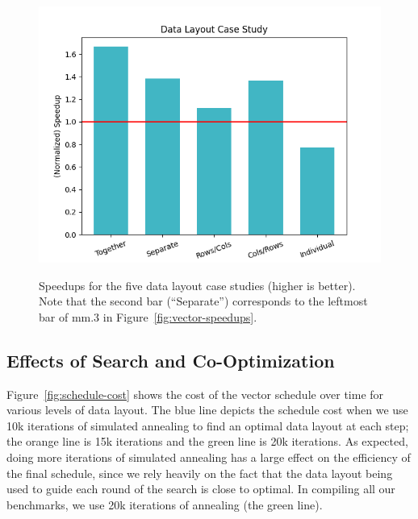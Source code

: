\begin{figure}
    \includegraphics[width=0.7\linewidth]{figures/graphs/case_study.png}
    \caption{Speedups for the five data layout case studies (higher is better). Note that the second bar (``Separate'') corresponds to the leftmost bar of {\sf mm.3} in Figure~\ref{fig:vector-speedups}.}
    \label{fig:data-layout-case-study}
\end{figure}


\subsection{Effects of Search and Co-Optimization}\label{sec:search-and-cooptimization}

Figure~\ref{fig:schedule-cost} shows the cost of the vector schedule over time for various levels of data layout.
The blue line depicts the schedule cost when we use 10k iterations of simulated annealing to find an optimal data layout at each step; the orange line is 15k iterations and the green line is 20k iterations.
As expected, doing more iterations of simulated annealing has a large effect on the efficiency of the final schedule, since we rely heavily on the fact that the data layout being used to guide each round of the search is close to optimal.
In compiling all our benchmarks, we use 20k iterations of annealing (the green line).

